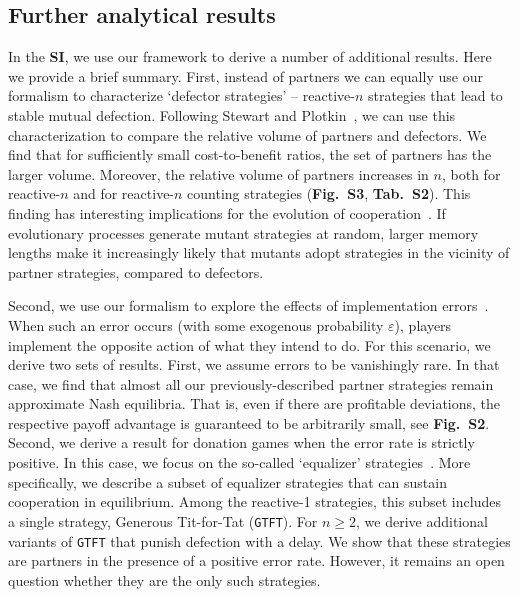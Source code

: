 \documentclass[9pt,twocolumn,twoside]{pnas-new}
\def\gtft{\texttt{GTFT}}
\def\SI{\textbf{SI}}
\begin{document}

\subsection*{Further analytical results}
In the \SI{}, we use our framework to derive a number of additional results. Here we provide a brief summary. 
First, instead of partners we can equally use our formalism to characterize `defector strategies' -- reactive-$n$ strategies that lead to stable mutual defection. 
Following Stewart and Plotkin~\citep{stewart:scientific:2016}, we can use this characterization to compare the relative volume of partners and defectors. 
We find that for sufficiently small cost-to-benefit ratios, the set of partners has the larger volume. 
Moreover, the relative volume of partners increases in $n$, both for reactive-$n$ and for reactive-$n$ counting strategies (\textbf{Fig.~S3}, \textbf{Tab.~S2}). 
This finding has interesting implications for the evolution of cooperation~\citep{stewart:pnas:2014,stewart:scientific:2016}. 
If evolutionary processes generate mutant strategies at random, larger memory lengths make it increasingly likely that mutants adopt strategies in the vicinity of partner strategies, compared to defectors.  

Second, we use our formalism to explore the effects of implementation errors~\citep{boyd:JTB:1989}. 
When such an error occurs (with some exogenous probability $\varepsilon$), players implement the opposite action of what they intend to do. 
For this scenario, we derive two sets of results. 
First, we assume errors to be vanishingly rare. 
In that case, we find that almost all our previously-described partner strategies remain approximate Nash equilibria. 
That is, even if there are profitable deviations, the respective payoff advantage is guaranteed to be arbitrarily small, see \textbf{Fig.~S2}. 
Second, we derive a result for donation games when the error rate is strictly positive.
In this case, we focus on the so-called `equalizer'
strategies~\cite{boerlijst:AMM:1997}. More specifically, we describe a subset of
equalizer strategies that can sustain cooperation in equilibrium. Among the
reactive-1 strategies, this subset includes a single strategy, Generous
Tit-for-Tat (\gtft). For $n\!\ge\!2$, we derive additional variants of \gtft{}
that punish defection with a delay. We show that these strategies are partners
in the presence of a positive error rate. However, it remains an open question
whether they are the only such strategies.
\end{document}

